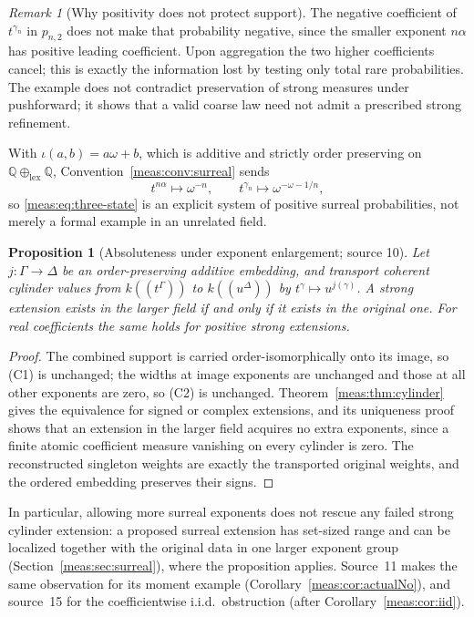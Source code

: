 \documentclass[11pt]{article}
\numberwithin{equation}{section}
\newtheorem{proposition}[theorem]{Proposition}
\theoremstyle{definition}
\theoremstyle{remark}
\newtheorem{remark}[theorem]{Remark}
\newcommand{\Q}{\mathbb Q}
\begin{document}
\begin{remark}[Why positivity does not protect support]
The negative coefficient of $t^{\gamma_n}$ in $p_{n,2}$ does not make that
probability negative, since the smaller exponent $n\alpha$ has positive
leading coefficient. Upon aggregation the two higher coefficients cancel; this
is exactly the information lost by testing only total rare probabilities. The
example does not contradict preservation of strong measures under pushforward;
it shows that a valid coarse law need not admit a prescribed strong
refinement.
\end{remark}

With $\iota(a,b)=a\omega+b$, which is additive and strictly order preserving on
$\Q\oplus_{\mathrm{lex}}\Q$, Convention~\ref{meas:conv:surreal} sends
\begin{equation}\label{meas:eq:surreal-coarse}
 t^{n\alpha}\mapsto\omega^{-n},\qquad t^{\gamma_n}\mapsto\omega^{-\omega-1/n},
\end{equation}
so \eqref{meas:eq:three-state} is an explicit system of positive surreal
probabilities, not merely a formal example in an unrelated field.

\begin{proposition}[Absoluteness under exponent enlargement; source 10]
\label{meas:prop:enlarge}
Let $j:\Gamma\to\Delta$ be an order-preserving additive embedding, and
transport coherent cylinder values from $k((t^\Gamma))$ to $k((u^\Delta))$ by
$t^\gamma\mapsto u^{j(\gamma)}$. A strong extension exists in the larger field if
and only if it exists in the original one. For real coefficients the same
holds for positive strong extensions.
\end{proposition}
\begin{proof}
The combined support is carried order-isomorphically onto its image, so (C1)
is unchanged; the widths at image exponents are unchanged and those at all
other exponents are zero, so (C2) is unchanged.
Theorem~\ref{meas:thm:cylinder} gives the equivalence for signed or complex
extensions, and its uniqueness proof shows that an extension in the larger
field acquires no extra exponents, since a finite atomic coefficient measure
vanishing on every cylinder is zero. The reconstructed singleton weights are
exactly the transported original weights, and the ordered embedding preserves
their signs.
\end{proof}

In particular, allowing more surreal exponents does not rescue any failed
strong cylinder extension: a proposed surreal extension has set-sized range and
can be localized together with the original data in one larger exponent group
(Section~\ref{meas:sec:surreal}), where the proposition applies. Source~11 makes
the same observation for its moment example
(Corollary~\ref{meas:cor:actualNo}), and source~15 for the coefficientwise
i.i.d.\ obstruction (after Corollary~\ref{meas:cor:iid}).
\end{document}
